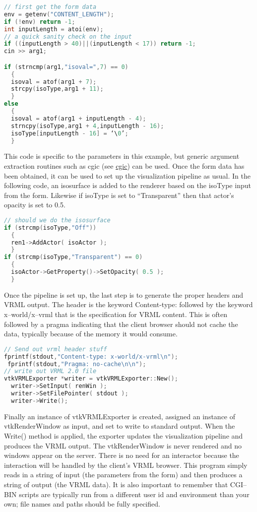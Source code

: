 \begin{lstlisting}[language=C++, caption={}, numbers=none, frame=none]
// first get the form data
env = getenv("CONTENT_LENGTH");
if (!env) return -1;
int inputLength = atoi(env);
// a quick sanity check on the input
if ((inputLength > 40)||(inputLength < 17)) return -1;
cin >> arg1;

if (strncmp(arg1,"isoval=",7) == 0)
  {
  isoval = atof(arg1 + 7);
  strcpy(isoType,arg1 + 11);
  }
else
  {
  isoval = atof(arg1 + inputLength - 4);
  strncpy(isoType,arg1 + 4,inputLength - 16);
  isoType[inputLength - 16] = ‘\0’;
  }
\end{lstlisting}

This code is specific to the parameters in this example, but generic argument extraction routines such as cgic (see \href{https://boutell.com/cgic/}{cgic}) can be used. Once the form data has been obtained, it can be used to set up the visualization pipeline as usual. In the following code, an isosurface is added to the renderer based on the isoType input from the form. Likewise if isoType is set to ``Transparent'' then that actor's opacity is set to 0.5.

\begin{lstlisting}[language=C++, caption={}, numbers=none, frame=none]
// should we do the isosurface
if (strcmp(isoType,"Off"))
  {
  ren1->AddActor( isoActor );
  }
if (strcmp(isoType,"Transparent") == 0)
  {
  isoActor->GetProperty()->SetOpacity( 0.5 );
  }
\end{lstlisting}

Once the pipeline is set up, the last step is to generate the proper headers and VRML output. The header is the keyword Content-type: followed by the keyword x--world/x--vrml that is the specification for VRML content. This is often followed by a pragma indicating that the client browser should not cache the data, typically because of the memory it would consume.

\begin{lstlisting}[language=C++, caption={}, numbers=none, frame=none]
// Send out vrml header stuff
fprintf(stdout,"Content-type: x-world/x-vrml\n");
 fprintf(stdout,"Pragma: no-cache\n\n");
// write out VRML 2.0 file
vtkVRMLExporter *writer = vtkVRMLExporter::New();
  writer->SetInput( renWin );
  writer->SetFilePointer( stdout );
  writer->Write();
\end{lstlisting}

Finally an instance of vtkVRMLExporter is created, assigned an instance of vtkRenderWindow as input, and set to write to standard output. When the Write() method is applied, the exporter updates the visualization pipeline and produces the VRML output. The vtkRenderWindow is never rendered and no windows appear on the server. There is no need for an interactor because the interaction will be handled by the client's VRML browser. This program simply reads in a string of input (the parameters from the form) and then produces a string of output (the VRML data). It is also important to remember that CGI--BIN scripts are typically run from a different user id and environment than your own; file names and paths should be fully specified.

